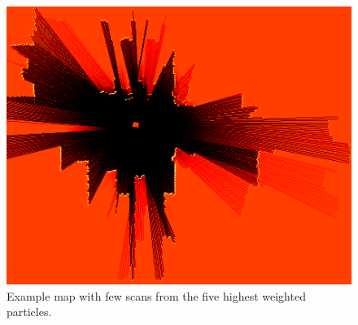 \begin{figure}
	\centering
	\includegraphics[width=0.7\linewidth]{figures/static_mapping/particle_sensor}
	\caption{Example map with few scans from the five highest weighted particles.}
	\label{fig:particle_sensor}
\end{figure}

